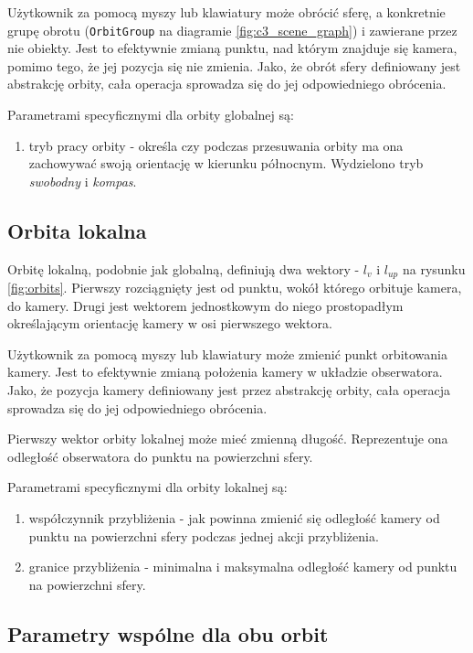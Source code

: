 Użytkownik za pomocą myszy lub klawiatury może obrócić sferę, a konkretnie grupę obrotu (\texttt{OrbitGroup} na diagramie \ref{fig:c3_scene_graph}) i zawierane przez nie obiekty. Jest to efektywnie zmianą punktu, nad którym znajduje się kamera, pomimo tego, że jej pozycja się nie zmienia. Jako, że obrót sfery definiowany jest abstrakcję orbity, cała operacja sprowadza się do jej odpowiedniego obrócenia. 

Parametrami specyficznymi dla orbity globalnej są:
\begin{enumerate}
    \item tryb pracy orbity - określa czy podczas przesuwania orbity ma ona zachowywać swoją orientację w kierunku północnym. Wydzielono tryb \textit{swobodny} i \textit{kompas}.
\end{enumerate}

\subsection{Orbita lokalna}

Orbitę lokalną, podobnie jak globalną, definiują dwa wektory - $l_v$ i $l_{up}$ na rysunku \ref{fig:orbits}. Pierwszy rozciągnięty jest od punktu, wokół którego orbituje kamera, do kamery. Drugi jest wektorem jednostkowym do niego prostopadłym określającym orientację kamery w osi pierwszego wektora.

Użytkownik za pomocą myszy lub klawiatury może zmienić punkt orbitowania kamery. Jest to efektywnie zmianą położenia kamery w układzie obserwatora. Jako, że pozycja kamery definiowany jest przez abstrakcję orbity, cała operacja sprowadza się do jej odpowiedniego obrócenia.

Pierwszy wektor orbity lokalnej może mieć zmienną długość. Reprezentuje ona odległość obserwatora do punktu na powierzchni sfery. 

Parametrami specyficznymi dla orbity lokalnej są:
\begin{enumerate}
    \item współczynnik przybliżenia - jak powinna zmienić się odległość kamery od punktu na powierzchni sfery podczas jednej akcji przybliżenia.
    \item granice przybliżenia - minimalna i maksymalna odległość kamery od punktu na powierzchni sfery.
\end{enumerate}

\subsection{Parametry wspólne dla obu orbit}

